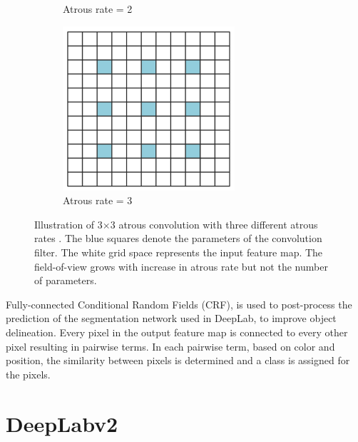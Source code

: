 \begin{figure}
\begin{subfigure}{.27\textwidth}
			\caption{Atrous rate = 2}
		\end{subfigure}
		\begin{subfigure}{.27\textwidth}
			\centering
			\includegraphics[width=1\linewidth]{images/r_3}
			\caption{Atrous rate = 3}
		\end{subfigure}
		\caption{Illustration of 3$\times$3 atrous convolution with three different atrous rates \cite{DBLP:journals/corr/Garcia-GarciaOO17}. The blue squares denote the parameters of the convolution filter. The white grid space represents the input feature map. The field-of-view grows with increase in atrous rate but not the number of parameters.}
		\label{Fig:atconv}
	\end{figure}
	
Fully-connected Conditional Random Fields (CRF), is used to post-process the prediction of the segmentation network used in DeepLab, to improve object delineation. Every pixel in the output feature map is connected to every other pixel resulting in pairwise terms. In each pairwise term, based on color and position, the similarity between pixels is determined and a class is assigned for the pixels.


\section{DeepLabv2}

